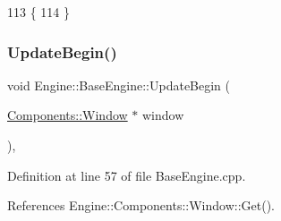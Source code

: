 \begin{DoxyCode}
113 \{
114 \}
\end{DoxyCode}
\mbox{\label{classEngine_1_1BaseEngine_aace6be2a42d12b64fbd35f1acdb08408}} 
\subsubsection{\texorpdfstring{Update\+Begin()}{UpdateBegin()}}
{\footnotesize\ttfamily void Engine\+::\+Base\+Engine\+::\+Update\+Begin (\begin{DoxyParamCaption}\item[{\mbox{\hyperlink{classEngine_1_1Components_1_1Window}{Components\+::\+Window}} $\ast$}]{window }\end{DoxyParamCaption})\hspace{0.3cm}{\ttfamily [virtual]}, {\ttfamily [inherited]}}



Definition at line 57 of file Base\+Engine.\+cpp.



References Engine\+::\+Components\+::\+Window\+::\+Get().


